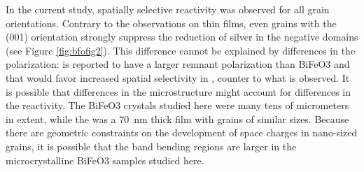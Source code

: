 \documentclass[12pt,%
              twoside,
               letterpaper]{uiothesis}
\begin{document}
In the current study, spatially selective reactivity was observed for all grain
orientations. Contrary to the observations on  thin films, even grains with the
(001) orientation strongly suppress the reduction of silver in the negative domains (see
Figure \ref{fig:bfofig2}). This difference cannot be explained by differences in the
polarization:  is reported to have a larger remnant polarization than
BiFeO3 and that would favor increased spatial selectivity in , counter to
what is observed.\cite{Kobayashi:2005wx} It is possible that differences in the
microstructure might account for differences in the reactivity. The BiFeO3 crystals
studied here were many tens of micrometers in extent, while the  was a
\SI{70}{\nano\meter} thick film with grains of similar sizes.\cite{Dunn:2007cx} Because
there are geometric constraints on the development of space charges in nano-sized grains,
it is possible that the band bending regions are larger in the microcrystalline
BiFeO3 samples studied here.\cite{ALBERY:1984tu}
\end{document}
